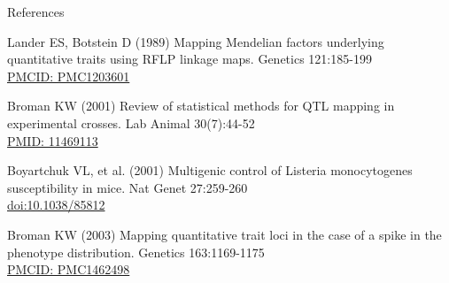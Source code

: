 \documentclass[aspectratio=169,12pt,t]{beamer}
\begin{document}
\begin{frame}{References}
\vspace{-7mm}

  \bbi

\item Lander ES, Botstein D (1989) Mapping Mendelian factors
  underlying quantitative traits using RFLP linkage maps. Genetics
  121:185-199 \\
  \href{https://www.ncbi.nlm.nih.gov/pmc/articles/PMC1203601}{\footnotesize
    PMCID: PMC1203601}

\item Broman KW (2001) Review of statistical methods for QTL mapping
  in experimental crosses. Lab Animal 30(7):44-52 \\
  \href{https://www.ncbi.nlm.nih.gov/pubmed/11469113}{\footnotesize
    PMID: 11469113}

\item Boyartchuk VL, et al. (2001) Multigenic control of Listeria monocytogenes
  susceptibility in mice. Nat Genet 27:259-260 \\
  \href{https://doi.org/10.1038/85812}{\footnotesize doi:10.1038/85812}

\item Broman KW (2003) Mapping quantitative trait loci in the case
  of a spike in the phenotype distribution. Genetics 163:1169-1175 \\
  \href{https://www.ncbi.nlm.nih.gov/pmc/articles/PMC1462498}{\footnotesize
    PMCID: PMC1462498}

\ei


\end{frame}
\end{document}
